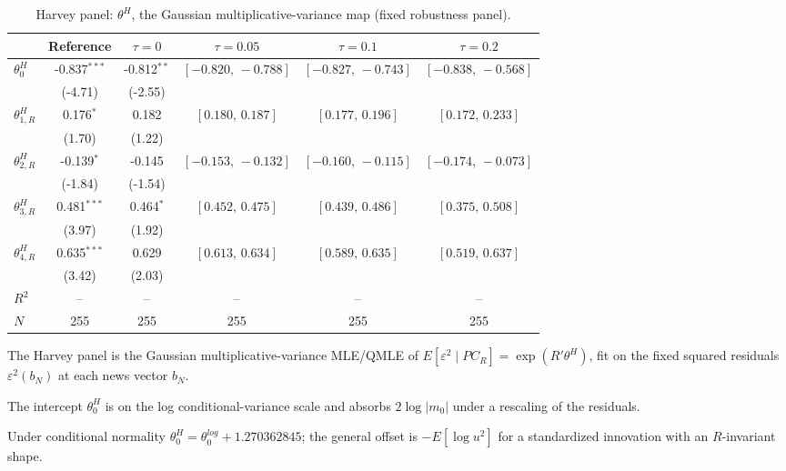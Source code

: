 \documentclass[11pt]{article}
\begin{document}
\begin{table}[!htbp]
\centering
\begin{threeparttable}
\caption{Harvey panel: $\theta^{H}$, the Gaussian multiplicative-variance map (fixed robustness panel).}
\label{tab:log_var_eq_panel_harvey}
\footnotesize\setlength{\tabcolsep}{3pt}
\begin{tabular}{lccccc}
\toprule
 & Reference & $\tau{=}0$ & $\tau{=}0.05$ & $\tau{=}0.1$ & $\tau{=}0.2$ \\
\midrule
$\theta^{H}_0$ & -0.837$^{***}$ & -0.812$^{**}$ & $[-0.820,\,-0.788]$ & $[-0.827,\,-0.743]$ & $[-0.838,\,-0.568]$ \\
 & (-4.71) & (-2.55) &  &  &  \\
\midrule
$\theta^{H}_{1,R}$ & 0.176$^{*}$ & 0.182 & $[0.180,\,0.187]$ & $[0.177,\,0.196]$ & $[0.172,\,0.233]$ \\
 & (1.70) & (1.22) &  &  &  \\
$\theta^{H}_{2,R}$ & -0.139$^{*}$ & -0.145 & $[-0.153,\,-0.132]$ & $[-0.160,\,-0.115]$ & $[-0.174,\,-0.073]$ \\
 & (-1.84) & (-1.54) &  &  &  \\
$\theta^{H}_{3,R}$ & 0.481$^{***}$ & 0.464$^{*}$ & $[0.452,\,0.475]$ & $[0.439,\,0.486]$ & $[0.375,\,0.508]$ \\
 & (3.97) & (1.92) &  &  &  \\
$\theta^{H}_{4,R}$ & 0.635$^{***}$ & 0.629 & $[0.613,\,0.634]$ & $[0.589,\,0.635]$ & $[0.519,\,0.637]$ \\
 & (3.42) & (2.03) &  &  &  \\
$R^2$ & -- & -- & -- & -- & -- \\
$N$ & 255 & 255 & 255 & 255 & 255 \\
\bottomrule
\end{tabular}
\begin{tablenotes}[flushleft]
\scriptsize
\item The Harvey panel is the Gaussian multiplicative-variance MLE/QMLE of $E[\varepsilon^2 \mid PC_R] = \exp(R'\theta^{H})$, fit on the fixed squared residuals $\varepsilon^2(b_N)$ at each news vector $b_N$.
\item The intercept $\theta^{H}_0$ is on the log conditional-variance scale and absorbs $2\log|m_0|$ under a rescaling of the residuals.
\item Under conditional normality $\theta^{H}_0 = \theta^{log}_0 + 1.270362845$; the general offset is $-E[\log u^2]$ for a standardized innovation with an $R$-invariant shape.

\end{tablenotes}
\end{threeparttable}
\end{table}
\end{document}
